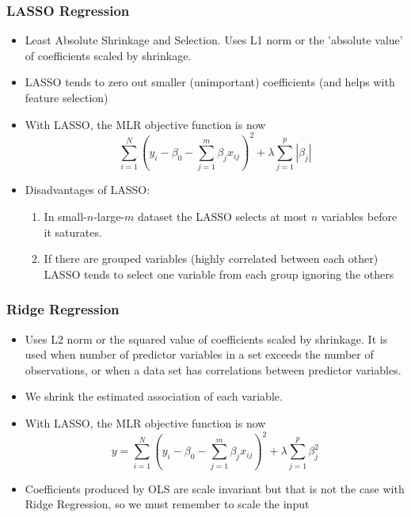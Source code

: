\documentclass{article}
\theoremstyle{plain}
\theoremstyle{definition}
\begin{document}
\subsubsection{LASSO Regression}
\begin{itemize}
    \item Least Absolute Shrinkage and Selection. Uses L1 norm or the 'absolute value' of coefficients scaled by shrinkage.
    
    \item LASSO tends to zero out smaller (unimportant) coefficients (and helps with feature selection)
    
    \item With LASSO, the MLR objective function is now
    \begin{equation}
        \sum_{i=1}^{N} \left ( y_i - \beta_0 - \sum_{j = 1}^{m} \beta_j x_{ij} \right )^2 + \lambda \sum_{j=1}^{p} \left | \beta_j \right |
    \end{equation}
    
    \item Disadvantages of LASSO:
    \begin{enumerate}
        \item In small-$n$-large-$m$ dataset the LASSO selects at most $n$ variables before it saturates.
        
        \item If there are grouped variables (highly correlated between each other) LASSO tends to select one variable from each group ignoring the others
    \end{enumerate}
\end{itemize}

\subsubsection{Ridge Regression}
\begin{itemize}
    \item Uses L2 norm or the squared value of coefficients scaled by shrinkage. It is used when number of predictor variables in a set exceeds the number of observations, or when a data set has correlations between predictor variables. 
    
    \item We shrink the estimated association of each variable. 
    
    \item With LASSO, the MLR objective function is now
    \begin{equation}
        y = \sum_{i=1}^{N} \left ( y_i - \beta_0 - \sum_{j = 1}^{m} \beta_j x_{ij} \right )^2 + \lambda \sum_{j=1}^{p} \beta_j^2
    \end{equation}
    
    \item Coefficients produced by OLS are scale invariant but that is not the case with Ridge Regression, so we must remember to scale the input
\end{itemize}
\end{document}

